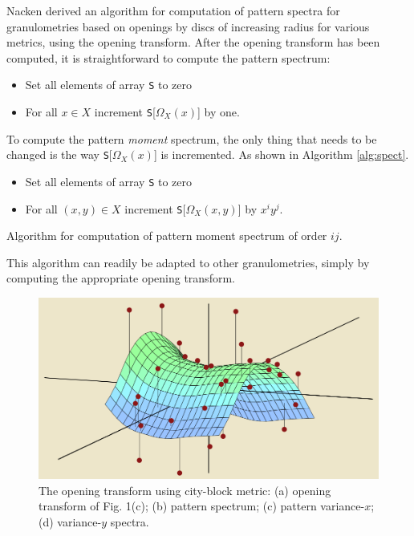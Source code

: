 \documentclass{sciposter}
\begin{document}
\begin{multicols}{3}
Nacken \cite{Nacken:thesis} derived an algorithm for computation
of pattern spectra for granulometries based on openings by discs of increasing
radius for various metrics, using the opening transform. After the
opening transform has been computed, it is straightforward to compute the 
pattern spectrum:
\begin{itemize}
\item Set all elements of array {\tt S} to zero
\item For all $x \in X$ increment {\tt S}[$\Omega_X(x)$] by one. 
\end{itemize}

To compute the pattern \emph{moment} spectrum, the only thing that needs to be
changed is the way {\tt S}[$\Omega_X(x)$] is incremented. As shown in Algorithm
\ref{alg:spect}.


\begin{algorithm}
\begin{itemize}
\item Set all elements of array {\tt S} to zero
\item For all $(x,y) \in X$ increment {\tt S}[$\Omega_X(x,y)$] by 
$x^iy^j$. 
\end{itemize}
\caption{ Algorithm for computation of pattern moment
spectrum of order $ij$. \label{alg:spect}}
\end{algorithm}

This algorithm can 
readily be adapted to other granulometries, simply by computing the 
appropriate opening transform.

\begin{figure}
\begin{center}
	\includegraphics[scale=0.75]{the-mean-machine-learning}
\end{center}
\caption{ \label{fig:tauspect} 
The opening transform using city-block metric: (a) opening transform of
Fig. 1(c); (b) pattern spectrum; (c) pattern variance-$x$; 
(d) variance-$y$ spectra.}
\end{figure}


\end{multicols}
\end{document}
